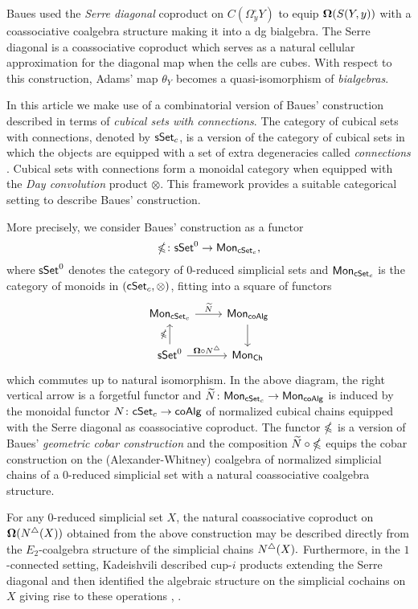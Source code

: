 Baues used the \textit{Serre diagonal} coproduct on $C(\Omega^{\square}_yY)$ to equip $\mathbf{\Omega}(S(Y,y))$ with a coassociative coalgebra structure making it into a dg bialgebra. The Serre diagonal is a coassociative coproduct which serves as a natural cellular approximation for the diagonal map when the cells are cubes. With respect to this construction, Adams' map $\theta_Y$ becomes a quasi-isomorphism of \textit{bialgebras}. 

In this article we make use of a combinatorial version of Baues' construction described in terms of \textit{cubical sets with connections}. The category of cubical sets with connections, denoted by $\mathsf{sSet}_c$, is a version of the category of cubical sets in which the objects are equipped with a set of extra degeneracies called \textit{connections} \cite{Brown-Higgins}. Cubical sets with connections form a monoidal category when equipped with the \textit{Day convolution} product $\otimes$. This framework provides a suitable categorical setting to describe Baues' construction.

More precisely, we consider Baues' construction as a functor $$\mathbb{\Omega} \colon \mathsf{sSet}^0 \to \mathsf{Mon}_{\mathsf{cSet}_c},$$
where $\mathsf{sSet}^0$ denotes the category of $0$-reduced simplicial sets and $\mathsf{Mon}_{\mathsf{cSet}_c}$ is the category of monoids in $(\mathsf{cSet}_c, \otimes)$, fitting into a square of functors
\begin{equation*}
\begin{tikzcd}
\Mon_{\cSet_c} \arrow[r, "\widetilde{\cchains}"] & \Mon_{\coAlg} \arrow[d] \\
\sSet^0 \arrow[r, "\cobar \circ \chains"] \arrow[u, "\gcobar"] & \Mon_{\Ch}
\end{tikzcd}
\end{equation*}
which commutes up to natural isomorphism. In the above diagram, the right vertical arrow is a forgetful functor and $\widetilde{N} \colon \mathsf{Mon}_{\mathsf{cSet}_c} \to \mathsf{Mon}_{\mathsf{coAlg}}$ is induced by the monoidal functor $N \colon \mathsf{cSet}_c \to \mathsf{coAlg}$ of normalized cubical chains equipped with the Serre diagonal as coassociative coproduct. The functor $\mathbb{\Omega}$ is a version of Baues' \textit{geometric cobar construction} and the composition $\widetilde{N} \circ \mathbb{\Omega}$ equips the cobar construction on the (Alexander-Whitney) coalgebra of normalized simplicial chains of a $0$-reduced simplicial set with a natural coassociative coalgebra structure. 

For any $0$-reduced simplicial set $X$, the natural coassociative coproduct on $\mathbf{\Omega} (N^{\triangle} (X))$ obtained from the above construction may be described directly from the $E_2$-coalgebra structure of the simplicial chains $N^{\triangle}(X).$ Furthermore, in  the $1$-connected setting, Kadeishvili described cup-$i$ products extending the Serre diagonal and then identified the algebraic structure on the simplicial cochains on $X$ giving rise to these operations \cite{Kadeishvili99coproducts},  \cite{Pilarczyk2016cubical}.

